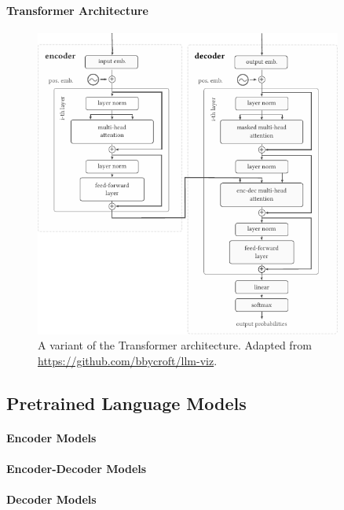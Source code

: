 \paragraph{Transformer Architecture}
\begin{figure}[h]
    \centering
    \includegraphics[width=0.9\textwidth]{img/transformer.pdf}
    \caption{A variant of the Transformer architecture. Adapted from \href{https://github.com/bbycroft/llm-viz/blob/main/src/llm/intro-image.svg}{https://github.com/bbycroft/llm-viz}.}
    \label{fig:transformer}
\end{figure}


\subsection{Pretrained Language Models}
\label{sec:plms}

\paragraph{Encoder Models}

\paragraph{Encoder-Decoder Models}

\paragraph{Decoder Models}

